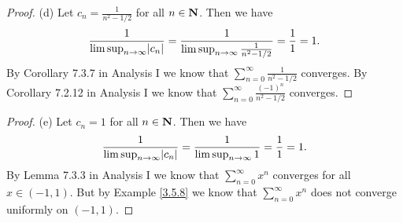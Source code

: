 \begin{proof}{(d)}
    Let \(c_n = \frac{1}{n^2 - 1 / 2}\) for all \(n \in \mathbf{N}\).
    Then we have
    \[
        \frac{1}{\limsup_{n \to \infty} \abs{c_n}} = \frac{1}{\limsup_{n \to \infty} \frac{1}{n^2 - 1 / 2}} = \frac{1}{1} = 1.
    \]
    By Corollary 7.3.7 in Analysis I we know that \(\sum_{n = 0}^\infty \frac{1}{n^2 - 1 / 2}\) converges.
    By Corollary 7.2.12 in Analysis I we know that \(\sum_{n = 0}^\infty \frac{(-1)^n}{n^2 - 1 / 2}\) converges.
\end{proof}

\begin{proof}{(e)}
    Let \(c_n = 1\) for all \(n \in \mathbf{N}\).
    Then we have
    \[
        \frac{1}{\limsup_{n \to \infty} \abs{c_n}} = \frac{1}{\limsup_{n \to \infty} 1} = \frac{1}{1} = 1.
    \]
    By Lemma 7.3.3 in Analysis I we know that \(\sum_{n = 0}^\infty x^n\) converges for all \(x \in (-1, 1)\).
    But by Example \ref{3.5.8} we know that \(\sum_{n = 0}^\infty x^n\) does not converge uniformly on \((-1, 1)\).
\end{proof}